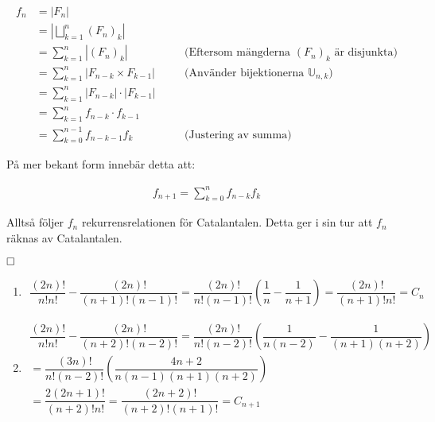 \documentclass{tufte-handout}
\begin{document}
\begin{ans}
    \vspace{-4mm}

    \begin{align*}
        f_n &= |F_n| \\
        &= |\bigsqcup_{k = 1}^{n} (F_n)_k| \\
        &= \sum_{k=1}^{n} |(F_n)_k| &&\quad \text{(Eftersom mängderna $(F_n)_k$ är disjunkta)} \\
        &= \sum_{k=1}^{n} |F_{n-k} \times F_{k-1}| &&\quad \text{(Använder bijektionerna $\mathbb{U}_{n, k}$)} \\
        &= \sum_{k=1}^{n} |F_{n-k}| \cdot |F_{k-1}| \\
        &= \sum_{k=1}^{n} f_{n-k} \cdot f_{k-1} \\
        &= \sum_{k=0}^{n-1} f_{n-k-1} f_{k} &&\quad \text{(Justering av summa)}
    \end{align*}

    \vspace{3mm}
    
    På mer bekant form innebär detta att:

    \vspace{-4mm}

    \begin{align*}
        f_{n+1} = \sum_{k=0}^{n} f_{n-k} f_{k}
    \end{align*}

    Alltså följer $f_n$ rekurrensrelationen för Catalantalen. Detta ger i sin tur att $f_n$ räknas av Catalantalen.

    $\hfill \square$
\end{ans}

\setcounter{ans}{2}
\begin{ans}
  \begin{enumerate}[label=(\alph*)]
    \item

      \begin{equation*}
        \begin{gathered}
          \dfrac{(2n)!}{n!n!}-\dfrac{(2n)!}{(n+1)!(n-1)!} = \dfrac{(2n)!}{n!(n-1)!}\left(\dfrac{1}{n}-\dfrac{1}{n+1}\right) = \dfrac{(2n)!}{(n+1)!n!} = C_n
        \end{gathered}
      \end{equation*}
      \par\bigskip
    \item 

      \begin{equation*}
        \begin{gathered}
          \dfrac{(2n)!}{n!n!}-\dfrac{(2n)!}{(n+2)!(n-2)!}=\dfrac{(2n)!}{n!(n-2)!}\left(\dfrac{1}{n(n-2)}-\dfrac{1}{(n+1)(n+2)}\right)\\
          = \dfrac{(3n)!}{n!(n-2)!}\left(\dfrac{4n+2}{n(n-1)(n+1)(n+2)}\right)\\
          = \dfrac{2(2n+1)!}{(n+2)!n!} = \dfrac{(2n+2)!}{(n+2)!(n+1)!} = C_{n+1}
        \end{gathered}
      \end{equation*}
  \end{enumerate}
\end{ans}
\end{document}
